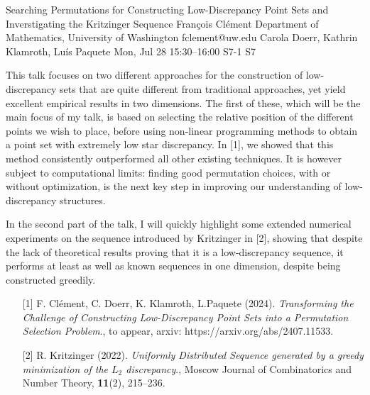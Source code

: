 \begin{talk}
  {Searching Permutations for Constructing Low-Discrepancy Point Sets and Inverstigating the Kritzinger Sequence}%
  {Fran\c{c}ois Cl\'{e}ment}%
  {Department of Mathematics, University of Washington}%
  {fclement@uw.edu}%
  {Carola Doerr, Kathrin Klamroth, Luís Paquete}%
  {}%
  {Mon, Jul 28 15:30–16:00}%
  {S7-1}%
  {S7}%
  
				
			
This talk focuses on two different approaches for the construction of low-discrepancy sets that are quite different from traditional approaches, yet yield excellent empirical results in two dimensions. The first of these, which will be the main focus of my talk, is based on selecting the relative position of the different points we wish to place, before using non-linear programming methods to obtain a point set with extremely low star discrepancy. In [1], we showed that this method consistently outperformed all other existing techniques. It is however subject to computational limits: finding good permutation choices, with or without optimization, is the next key step in improving our understanding of low-discrepancy structures.

In the second part of the talk, I will quickly highlight some extended numerical experiments on the sequence introduced by Kritzinger in [2], showing that despite the lack of theoretical results proving that it is a low-discrepancy sequence, it performs at least as well as known sequences in one dimension, despite being constructed greedily. 

\medskip

\begin{enumerate}
	\item[{[1]}] F. Clément, C. Doerr, K. Klamroth, L.Paquete (2024). {\it Transforming the Challenge of Constructing Low-Discrepancy Point Sets into a Permutation Selection Problem}., to appear, arxiv: https://arxiv.org/abs/2407.11533.
	\item[{[2]}] R. Kritzinger (2022).  {\it Uniformly Distributed Sequence generated by a greedy minimization of the $L_2$ discrepancy}., Moscow Journal of Combinatorics and Number Theory, \textbf{11}(2), 215--236.
\end{enumerate}

\end{talk}

